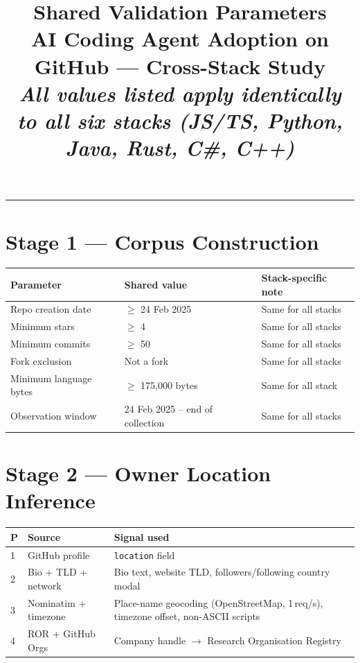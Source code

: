 \documentclass[9.5pt,a4paper]{article}
\title{
  \vspace{-1.3cm}
  {\large\textbf{Shared Validation Parameters}}\\[2pt]
  {\normalsize AI Coding Agent Adoption on GitHub --- Cross-Stack Study}\\[1pt]
  {\small\textit{All values listed apply identically to all six stacks (JS/TS, Python, Java, Rust, C\#, C++)}}
}
\date{}
\author{}
\begin{document}
\maketitle
\vspace{-14pt}
\hrule
\vspace{3pt}

\section{Stage 1 — Corpus Construction}

\begin{tabular}{@{}p{5cm} p{7cm} p{4cm}@{}}
\toprule
\textbf{Parameter} & \textbf{Shared value} & \textbf{Stack-specific note} \\
\midrule
\rowcolor{rowgray}
Repo creation date & $\geq$ 24 Feb 2025 & Same for all stacks \\
Minimum stars & $\geq$ 4 & Same for all stacks \\
\rowcolor{rowgray}
Minimum commits & $\geq$ 50 & Same for all stacks \\
Fork exclusion & Not a fork & Same for all stacks \\
\rowcolor{rowgray}
Minimum language bytes & $\geq$ 175,000 bytes & Same for all stack \\
Observation window & 24 Feb 2025 -- end of collection & Same for all stacks \\
\bottomrule
\end{tabular}

\section{Stage 2 — Owner Location Inference}

\begin{tabular}{@{}p{0.4cm} p{5cm} p{10cm}@{}}
\toprule
\textbf{P} & \textbf{Source} & \textbf{Signal used} \\
\midrule
\rowcolor{rowgray}
1 & GitHub profile & \texttt{location} field \\
2 & Bio + TLD + network & Bio text, website TLD, followers/following country modal \\
\rowcolor{rowgray}
3 & Nominatim + timezone & Place-name geocoding (OpenStreetMap, 1\,req/s), timezone offset, non-ASCII scripts \\
4 & ROR + GitHub Orgs & Company handle $\to$ Research Organisation Registry \\
\bottomrule
\end{tabular}
\end{document}
